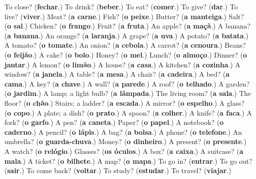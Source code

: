\begin{tcolorbox}[breakable,colback=teal!4,colframe=teal!35!black,title={Before you move on}]
To close? (\textbf{fechar}.) To drink? (\textbf{beber}.) To eat? (\textbf{comer}.) To give? (\textbf{dar}.) To live? (\textbf{viver}.) Meat? (\textbf{a carne}.) Fish? (\textbf{o peixe}.) Butter? (\textbf{a manteiga}.) Salt? (\textbf{o sal}.) Chicken? (\textbf{o frango}.) Fruit? (\textbf{a fruta}.) An apple? (\textbf{a maçã}.) A banana? (\textbf{a banana}.) An orange? (\textbf{a laranja}.) A grape? (\textbf{a uva}.) A potato? (\textbf{a batata}.) A tomato? (\textbf{o tomate}.) An onion? (\textbf{a cebola}.) A carrot? (\textbf{a cenoura}.) Beans? (\textbf{o feijão}.) A cake? (\textbf{o bolo}.) Honey? (\textbf{o mel}.) Lunch? (\textbf{o almoço}.) Dinner? (\textbf{o jantar}.) A lemon? (\textbf{o limão}.) A house? (\textbf{a casa}.) A kitchen? (\textbf{a cozinha}.) A window? (\textbf{a janela}.) A table? (\textbf{a mesa}.) A chair? (\textbf{a cadeira}.) A bed? (\textbf{a cama}.) A key? (\textbf{a chave}.) A wall? (\textbf{a parede}.) A roof? (\textbf{o telhado}.) A garden? (\textbf{o jardim}.) A lamp; a light bulb? (\textbf{a lâmpada}.) The living room? (\textbf{a sala}.) The floor? (\textbf{o chão}.) Stairs; a ladder? (\textbf{a escada}.) A mirror? (\textbf{o espelho}.) A glass? (\textbf{o copo}.) A plate; a dish? (\textbf{o prato}.) A spoon? (\textbf{a colher}.) A knife? (\textbf{a faca}.) A fork? (\textbf{o garfo}.) A pen? (\textbf{a caneta}.) Paper? (\textbf{o papel}.) A notebook? (\textbf{o caderno}.) A pencil? (\textbf{o lápis}.) A bag? (\textbf{a bolsa}.) A phone? (\textbf{o telefone}.) An umbrella? (\textbf{o guarda-chuva}.) Money? (\textbf{o dinheiro}.) A present? (\textbf{o presente}.) A watch? (\textbf{o relógio}.) Glasses? (\textbf{os óculos}.) A box? (\textbf{a caixa}.) A suitcase? (\textbf{a mala}.) A ticket? (\textbf{o bilhete}.) A map? (\textbf{o mapa}.) To go in? (\textbf{entrar}.) To go out? (\textbf{sair}.) To come back? (\textbf{voltar}.) To study? (\textbf{estudar}.) To travel? (\textbf{viajar}.)
\end{tcolorbox}
